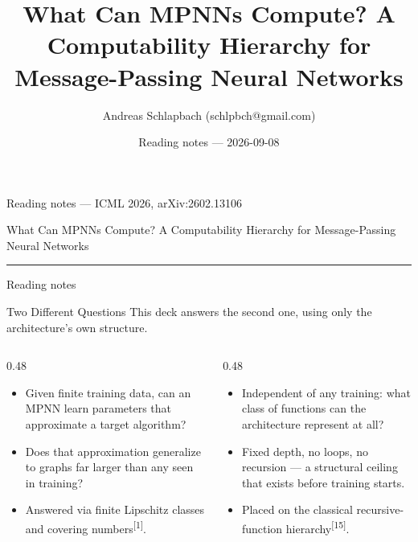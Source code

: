 \documentclass[10pt,aspectratio=169,draft]{beamer}
\title[What Can MPNNs Compute?]%
  {What Can MPNNs Compute? A Computability Hierarchy for Message-Passing Neural Networks}
\author{Andreas Schlapbach (schlpbch@gmail.com)}
\date{Reading notes --- 2026-09-08}
\newcommand{\pcite}[1]{\textsuperscript{[#1]}}
\begin{document}
\begin{frame}[plain]
  \vspace*{0.9cm}
  {\plexmedium\small\color{ascTeal600}Reading notes --- ICML 2026, arXiv:2602.13106\par}
  \vspace{0.35cm}
  {%
    What Can MPNNs Compute? A Computability Hierarchy for Message-Passing Neural Networks\par}
  \vspace{0.18cm}
  {\color{ascTeal500}\rule{28pt}{2.4pt}\par}
  \vspace{0.90cm}
  {\par}
  \vspace{0.10cm}
  {%
    Reading notes}
\end{frame}


\begin{frame}{Two Different Questions}
  This deck answers the second one, using only the architecture's own structure.
  \vspace{0.25cm}
  \begin{columns}[T]
    \begin{column}{0.48\textwidth}
      \begin{itemize}
        \item Given finite training data, can an MPNN learn parameters that approximate a target algorithm?
        \item Does that approximation generalize to graphs far larger than any seen in training?
        \item Answered via finite Lipschitz classes and covering numbers\pcite{1}.
      \end{itemize}
    \end{column}
    \begin{column}{0.48\textwidth}
      \begin{itemize}
        \item Independent of any training: what class of functions can the architecture represent at all?
        \item Fixed depth, no loops, no recursion --- a structural ceiling that exists before training starts.
        \item Placed on the classical recursive-function hierarchy\pcite{15}.
      \end{itemize}
    \end{column}
  \end{columns}
\end{frame}
\end{document}
